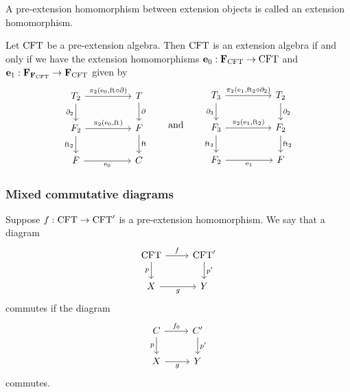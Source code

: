 \documentclass[handout]{beamer}
\begin{document}
\begin{frame}
\begin{definition}
A pre-extension homomorphism between extension objects is called an extension
homomorphism.
\end{definition}

\begin{lemma}
Let $\mathrm{CFT}$ be a pre-extension algebra. Then $\mathrm{CFT}$ is an extension
algebra if and only if we have the extension homomorphisms
$\mathbf{e}_0:\mathbf{F}_{\mathrm{CFT}}\to\mathrm{CFT}$
and
$\mathbf{e}_1:\mathbf{F}_{\mathbf{F}_{\mathrm{CFT}}}\to\mathbf{F}_{\mathrm{CFT}}$
given by
\begin{equation*}
\begin{tikzcd}[ampersand replacement=\&,column sep=huge]
\stesyst_2
  \ar{r}{\pullbackpr{2}{\ectxext}{\eft\circ\ebd}}
  \ar{d}[swap]{\ebd[2]}
  \&
\stesyst
  \ar{d}{\ebd}
  \\
\stesysf_2
  \ar{r}{\pullbackpr{2}{\ectxext}{\eft}}
  \ar{d}[swap]{\eft[2]}
  \&
\stesysf
  \ar{d}{\eft}
  \\
\stesysf
  \ar{r}[swap]{\ectxext}
  \&
\stesysc
\end{tikzcd}
\qquad\text{and}\qquad
\begin{tikzcd}[ampersand replacement=\&,column sep=huge]
\stesyst_3
  \ar{r}{\pullbackpr{2}{\efamext}{\eft[2]\circ\ebd[2]}}
  \ar{d}[swap]{\ebd[3]}
  \&
\stesyst_2
  \ar{d}{\ebd[2]}
  \\
\stesysf_3
  \ar{r}{\pullbackpr{2}{\efamext}{\eft[2]}}
  \ar{d}[swap]{\eft[3]}
  \&
\stesysf_2
  \ar{d}{\eft[2]}
  \\
\stesysf_2
  \ar{r}[swap]{\efamext}
  \&
\stesysf
\end{tikzcd}
\end{equation*}
\end{lemma}
\end{frame}

\begin{frame}
\frametitle{Mixed commutative diagrams}
Suppose $f:\mathrm{CFT}\to\mathrm{CFT}'$ is a pre-extension homomorphism. We say that
a diagram
\begin{equation*}
\begin{tikzcd}[ampersand replacement=\&]
\stesys
  \ar{r}{f}
  \ar{d}[swap]{p}
  \&
\stesys'
  \ar{d}{p'}
  \\
X \ar{r}[swap]{g}
  \&
Y
\end{tikzcd}
\end{equation*}
commutes if the diagram
\begin{equation*}
\begin{tikzcd}[ampersand replacement=\&]
\stesysc
  \ar{r}{f_0}
  \ar{d}[swap]{p}
  \&
\stesysc'
  \ar{d}{p'}
  \\
X \ar{r}[swap]{g}
  \&
Y
\end{tikzcd}
\end{equation*}
commutes.
\end{frame}
\end{document}

